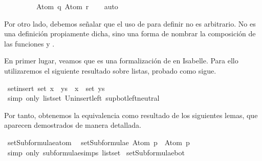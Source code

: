 \begin{isabellebody}
\ \ \ \ \ \ \ \ \ Atom\ q{\isacharcomma}\ Atom\ r{\isacharbraceright}{\isachardoublequoteclose}\isanewline
\ \ \isamarkupfalse%
\ auto%
\endisatagproof
{\isafoldproof}%
%
\isadelimproof
\ \ \ \isanewline
%
\endisadelimproof
{}\isamarkupfalse%
%
\begin{isamarkuptext}%
Por otro lado, debemos señalar que el uso de 
   para definir  no es 
  arbitrario. No es una definición propiamente dicha, sino 
  una forma de nombrar la composición de las funciones  y 
  .


  En primer lugar, veamos que  es una
  formalización de  en Isabelle. Para ello 
  utilizaremos el siguiente resultado sobre listas, probado como sigue.%
\end{isamarkuptext}\isamarkuptrue%
\isamarkupfalse%
\ set{\isacharunderscore}insert{\isacharcolon}\ {\isachardoublequoteopen}set\ {\isacharparenleft}x\ {\isacharhash}\ ys{\isacharparenright}\ {\isacharequal}\ {\isacharbraceleft}x{\isacharbraceright}\ {\isasymunion}\ set\ ys{\isachardoublequoteclose}\isanewline
%
\isadelimproof
\ \ %
\endisadelimproof
%
\isatagproof
{}\isamarkupfalse%
\ {\isacharparenleft}simp\ only{\isacharcolon}\ list{\isachardot}set{\isacharparenleft}{}{\isacharparenright}\ Un{\isacharunderscore}insert{\isacharunderscore}left\ sup{\isacharunderscore}bot{\isachardot}left{\isacharunderscore}neutral{\isacharparenright}%
\endisatagproof
{\isafoldproof}%
%
\isadelimproof
%
\endisadelimproof
%
\begin{isamarkuptext}%
Por tanto, obtenemos la equivalencia como resultado de los 
  siguientes lemas, que aparecen demostrados de manera detallada.%
\end{isamarkuptext}\isamarkuptrue%
\isamarkupfalse%
\ setSubformulae{\isacharunderscore}atom{\isacharcolon}\isanewline
\ \ {\isachardoublequoteopen}setSubformulae\ {\isacharparenleft}Atom\ p{\isacharparenright}\ {\isacharequal}\ {\isacharbraceleft}Atom\ p{\isacharbraceright}{\isachardoublequoteclose}\isanewline
%
\isadelimproof
\ \ \ \ %
\endisadelimproof
%
\isatagproof
{}\isamarkupfalse%
\ {\isacharparenleft}simp\ only{\isacharcolon}\ subformulae{\isachardot}simps{\isacharparenleft}{}{\isacharparenright}\ list{\isachardot}set{\isacharparenright}%
\endisatagproof
{\isafoldproof}%
%
\isadelimproof
\isanewline
%
\endisadelimproof
\isanewline
{}\isamarkupfalse%
\ setSubformulae{\isacharunderscore}bot{\isacharcolon}\isanewline

\end{isabellebody}
